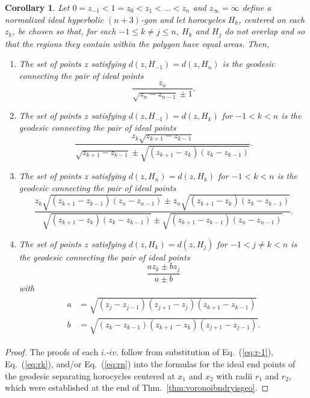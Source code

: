 \documentclass[10pt,a4paper]{article}
\newtheorem{corollary}{Corollary}
\begin{document}
 \begin{corollary} Let $0 = z_{-1} < 1 = z_0 < z_1 < \ldots < z_n$ and $z_{\infty} = \infty$ define a normalized ideal hyperbolic $(n+3)$-gon and let horocycles $H_k$, centered on each $z_k$, be chosen so that, for each $-1 \leq k \neq j \leq n$, $H_k$ and $H_j$ do not overlap and so that the regions they contain within the polygon have equal areas. Then,

 \begin{enumerate}[label=\roman*.]
 \item The set of points $z$ satisfying $d(z, H_{-1}) = d(z, H_{n})$ is the geodesic connecting the pair of ideal points
 \[
 \frac{z_n}{\sqrt{z_n-z_{n-1}} \pm 1}.
 \]
 \item The set of points $z$ satisfying $d(z, H_{-1}) = d(z, H_{k})$ for $-1 < k < n$ is the geodesic connecting the pair of ideal points
 \[
     \frac{z_k \sqrt{z_{k+1}-z_{k-1}}}{\sqrt{z_{k+1}-z_{k-1}} \pm \sqrt{(z_{k+1}-z_k)(z_k-z_{k-1})}}.
 \]
 \item The set of points $z$ satisfying $d(z, H_{n}) = d(z, H_{k})$ for $-1 < k < n$ is the geodesic connecting the pair of ideal points
 \[
     \frac{z_k \sqrt{(z_{k+1}-z_{k-1})(z_{n} - z_{n-1})} \pm z_n\sqrt{(z_{k+1}-z_k)(z_k-z_{k-1})}}{\sqrt{(z_{k+1}-z_k)(z_k-z_{k-1})} \pm \sqrt{(z_{k+1}-z_{k-1})(z_{n} - z_{n-1})}}.
 \]
 \item The set of points $z$ satisfying $d(z, H_{k}) = d(z, H_{j})$ for $-1 <j \neq k < n$ is the geodesic connecting the pair of ideal points 
 \[
 \frac{a z_k \pm b z_j}{a \pm b}
 \]
 with 
 \begin{align*}
     \begin{aligned}
         a &= \sqrt{\left(z_j-z_{j-1}\right) \left(z_{j+1}-z_j\right)\left(z_{k+1}-z_{k-1}\right)} \\
         b &= \sqrt{\left(z_k-z_{k-1}\right) \left(z_{k+1}-z_k\right)\left(z_{j+1}-z_{j-1}\right)}.
     \end{aligned}
 \end{align*}
 \end{enumerate}

 \label{cor:voronoibndryisgeo2}
 \end{corollary}
 \begin{proof}
   The proofs of each $i.$-$iv.$ follow from substitution of Eq.\ (\ref{eq:r-1}), Eq.\ (\ref{eq:rk}), and/or Eq.\ (\ref{eq:rn}) into the formulas for the ideal end points of the geodesic separating horocycles centered at $x_1$ and $x_2$ with radii $r_1$ and $r_2$, which were established at the end of Thm.\ \ref{thm:voronoibndryisgeo}.
 \end{proof}
\end{document}
